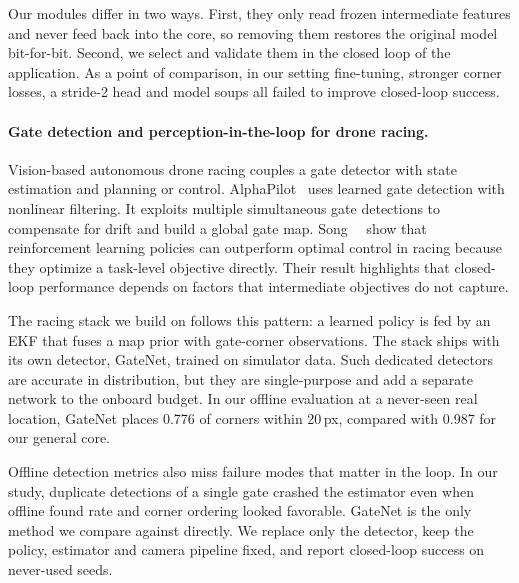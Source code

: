 \documentclass[10pt,twocolumn,letterpaper]{article}
\begin{document}
Our modules differ in two ways. First, they only read frozen intermediate features and never feed back into the core, so removing them restores the original model bit-for-bit. Second, we select and validate them in the closed loop of the application. As a point of comparison, in our setting fine-tuning, stronger corner losses, a stride-2 head and model soups all failed to improve closed-loop success.

\paragraph{Gate detection and perception-in-the-loop for drone racing.}
Vision-based autonomous drone racing couples a gate detector with state estimation and planning or control. AlphaPilot~\cite{Foehn2020AlphapilotAutonomous} uses learned gate detection with nonlinear filtering. It exploits multiple simultaneous gate detections to compensate for drift and build a global gate map. Song~\etal~\cite{Song2023ReachingLimit} show that reinforcement learning policies can outperform optimal control in racing because they optimize a task-level objective directly. Their result highlights that closed-loop performance depends on factors that intermediate objectives do not capture.

The racing stack we build on follows this pattern: a learned policy is fed by an EKF that fuses a map prior with gate-corner observations. The stack ships with its own detector, GateNet, trained on simulator data. Such dedicated detectors are accurate in distribution, but they are single-purpose and add a separate network to the onboard budget. In our offline evaluation at a never-seen real location, GateNet places 0.776 of corners within 20\,px, compared with 0.987 for our general core.

Offline detection metrics also miss failure modes that matter in the loop. In our study, duplicate detections of a single gate crashed the estimator even when offline found rate and corner ordering looked favorable. GateNet is the only method we compare against directly. We replace only the detector, keep the policy, estimator and camera pipeline fixed, and report closed-loop success on never-used seeds.
\end{document}
